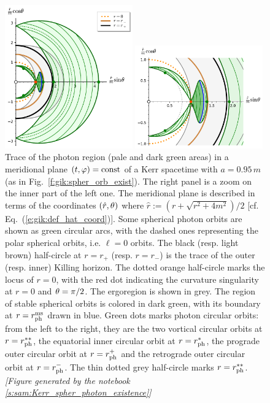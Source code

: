 \begin{figure}
\parbox[c]{0.49\textwidth}{\includegraphics[width=0.49\textwidth]{gik_spo_meridional.pdf}}
\parbox[c]{0.49\textwidth}{\includegraphics[width=0.49\textwidth]{gik_spo_meridional_zoom.pdf}}
\caption[]{\label{f:gik:spo_meridional} \footnotesize
Trace of the photon region (pale and dark green areas) in
a meridional plane $(t,\varphi)=\mathrm{const}$ of
a Kerr spacetime with $a = 0.95\, m$ (as in Fig.~\ref{f:gik:spher_orb_exist}).
The right panel is a zoom on the inner part of the left one.
The meridional plane is described in terms of the coordinates $(\hat{r},\theta)$
where $\hat{r} := (r + \sqrt{r^2 + 4m^2})/2$ [cf. Eq.~(\ref{e:gik:def_hat_coord})].
Some spherical photon orbits are shown as green circular arcs,
with the dashed ones representing the polar spherical orbits, i.e. $\ell=0$ orbits.
The black (resp. light brown) half-circle at $r=r_+$ (resp. $r=r_-$)
is the trace of the outer (resp. inner) Killing horizon.
The dotted orange half-circle marks the locus of $r=0$, with the
red dot indicating the curvature singularity at $r=0$ and $\theta=\pi/2$.
The ergoregion is shown in grey. The region of stable spherical orbits is
colored in dark green, with its boundary at $r=r_{\rm ph}^{\rm ms}$ drawn in blue.
Green dots marks photon circular orbits: from the left to the right, they
are the two vortical circular orbits at $r=r_{\rm ph}^{**}$, the equatorial
inner circular orbit at $r=r_{\rm ph}^*$, the prograde outer circular orbit
at $r=r_{\rm ph}^+$ and the retrograde outer circular orbit at $r=r_{\rm ph}^-$.
The thin dotted grey half-circle marks $r=r_{\rm ph}^{**}$.
\textsl{[Figure generated by the notebook \ref{s:sam:Kerr_spher_photon_existence}]}
}
\end{figure}



